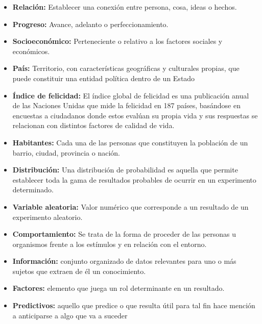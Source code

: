 \documentclass[12pt,oneside,letterpaper,spanish]{article}
\begin{document}
\begin{itemize}
    \item \textbf{Relación:} Establecer una conexión entre persona, cosa, ideas o hechos.
    
    \item \textbf{Progreso:} Avance, adelanto o perfeccionamiento.

    \item \textbf{Socioeconómico:} Perteneciente o relativo a los factores sociales y económicos.
    
    \item \textbf{País:} Territorio, con características geográficas y culturales propias, que puede constituir una entidad política dentro de un Estado

    \item \textbf{Índice de felicidad:} El índice global de felicidad es una publicación anual de las Naciones Unidas que mide la felicidad en 187 países, basándose en encuestas a ciudadanos donde estos evalúan su propia vida y sus respuestas se relacionan con distintos factores de calidad de vida.

    \item \textbf{Habitantes:} Cada una de las personas que constituyen la población de un barrio, ciudad, provincia o nación.

    \item \textbf{Distribución:} Una distribución de probabilidad es aquella que permite establecer toda la gama de resultados probables de ocurrir en un experimento determinado.

    \item \textbf{Variable aleatoria:} Valor numérico que corresponde a un resultado de un experimento aleatorio. 

    \item \textbf{Comportamiento:} Se trata de la forma de proceder de las personas u organismos frente a los estímulos y en relación con el entorno.

    \item \textbf{Información:} conjunto organizado de datos relevantes para uno o más sujetos que extraen de él un conocimiento.

    \item \textbf{Factores:}  elemento que juega un rol determinante en un resultado.

    \item \textbf{Predictivos:} aquello que predice o que resulta útil para tal fin hace mención a anticiparse a algo que va a suceder
    
\end{itemize}
\end{document}

